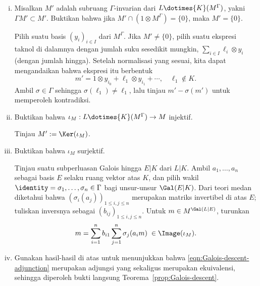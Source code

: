 	\begin{enumerate}[(i)]
		\item Misalkan $M'$ adalah subruang $\Gamma$-invarian dari
		$L\dotimes{K}(M^\Gamma)$, yakni $\Gamma M'\subset M'$. Buktikan bahwa
		jika $M'\cap(1\otimes M^\Gamma)=\{0\}$, maka $M'=\{0\}$.

		\begin{hint}
			Pilih suatu basis $(y_i)_{i\in I}$ dari $M^\Gamma$. Jika
			$M'\neq\{0\}$, pilih suatu ekspresi taknol di dalamnya dengan jumlah
			suku sesedikit mungkin, $\sum_{i\in I}\ell_i\otimes y_i$ (dengan
			jumlah hingga). Setelah normalisasi yang sesuai, kita dapat
			mengandaikan bahwa ekspresi itu
			berbentuk
			\[ m' = 1 \otimes y_{i_0} + \ell_1 \otimes y_{i_1} + \cdots, \quad \ell_1 \notin K. \]
			Ambil $\sigma\in\Gamma$ sehingga
			$\sigma(\ell_1)\neq\ell_1$, lalu tinjau $m'-\sigma(m')$ untuk
			memperoleh kontradiksi.
		\end{hint}

		\item Buktikan bahwa
		$\iota_M:L\dotimes{K}(M^\Gamma)\to M$ injektif.
		\begin{hint}
			Tinjau $M':=\Ker(\iota_M)$.
		\end{hint}

		\item Buktikan bahwa $\iota_M$ surjektif.

		\begin{hint}
			Tinjau suatu subperluasan Galois hingga $E|K$ dari $L|K$. Ambil
			$a_1,\ldots,a_n$ sebagai basis $E$ selaku ruang vektor atas $K$, dan pilih
			wakil $\identity=\sigma_1,\ldots,\sigma_n\in\Gamma$ bagi unsur-unsur
			$\Gal(E|K)$. Dari teori medan diketahui bahwa
			$(\sigma_i(a_j))_{1\leq i,j\leq n}$ merupakan matriks invertibel di
			atas $E$; tuliskan inversnya sebagai
			$(b_{ij})_{1\leq i,j\leq n}$. Untuk
			$m\in M^{\Gal(L|E)}$, turunkan
			\[ m = \sum_{i=1}^n b_{i1} \sum_{j=1}^n \sigma_j(a_i m) \; \in \Image(\iota_M). \]
		\end{hint}

		\item Gunakan hasil-hasil di atas untuk menunjukkan bahwa
		\eqref{eqn:Galois-descent-adjunction} merupakan adjungsi yang sekaligus
		merupakan ekuivalensi,
		sehingga diperoleh bukti langsung
		Teorema~\ref{prop:Galois-descent}.
	\end{enumerate}

